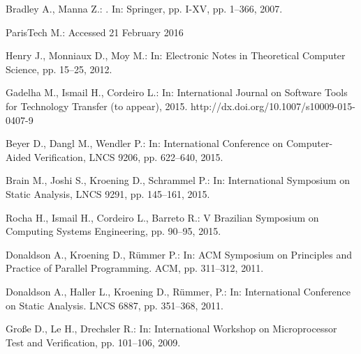 \documentclass{acm_sen_article}
\begin{document}
\begin{thebibliography}{1}
Bradley A., Manna Z.:
. 
\newblock In: Springer, pp. I-XV, pp. 1--366, 2007.

ParisTech M.:
\newblock Accessed 21 February 2016

Henry J., Monniaux D., Moy M.: 
\newblock In: Electronic Notes in Theoretical Computer Science, pp. 15--25, 2012.

Gadelha M., Ismail H., Cordeiro L.:
\newblock In: International Journal on Software Tools for Technology Transfer (to appear), 2015.
\newblock http://dx.doi.org/10.1007/s10009-015-0407-9

Beyer D., Dangl M., Wendler P.:
\newblock In: International Conference on Computer-Aided Verification, LNCS 9206, pp. 622--640, 2015.

Brain M., Joshi S., Kroening D., Schrammel P.:
\newblock In: International Symposium on Static Analysis, LNCS 9291, pp. 145--161, 2015.

Rocha H., Ismail H., Cordeiro L., Barreto R.:
\newblock V Brazilian Symposium on Computing Systems Engineering, pp. 90--95, 2015.

Donaldson A., Kroening D., R{\"{u}}mmer P.:
\newblock In: ACM Symposium on Principles and Practice of Parallel Programming. ACM, pp. 311--312, 2011.

Donaldson A., Haller L., Kroening D., R{\"{u}}mmer, P.:
\newblock In: International Conference on Static Analysis. LNCS 6887, pp. 351--368, 2011.

Gro{\ss}e D., Le H., Drechsler R.:
\newblock In: International Workshop on Microprocessor Test and Verification, pp. 101--106, 2009.


\end{thebibliography}
\end{document}
